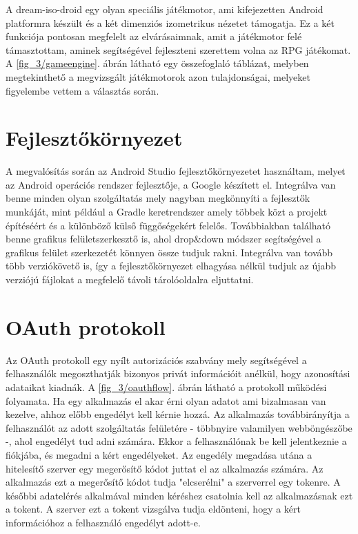 
A dream-iso-droid egy olyan speciális játékmotor, ami kifejezetten Android platformra készült és a két dimenziós izometrikus nézetet támogatja. 
Ez a két funkciója pontosan megfelelt az elvárásaimnak, amit a játékmotor felé támasztottam, aminek segítségével fejleszteni szerettem volna az RPG játékomat.
A \ref{fig_3/gameengine}. ábrán látható egy összefoglaló táblázat, melyben megtekinthető a megvizsgált játékmotorok azon tulajdonságai, melyeket figyelembe vettem a választás során. 

\section*{Fejlesztőkörnyezet}
\label{ide}

A megvalósítás során az Android Studio fejlesztőkörnyezetet használtam, melyet az Android operációs rendszer fejlesztője, a Google készített el. 
Integrálva van benne minden olyan szolgáltatás mely nagyban megkönnyíti a fejlesztők munkáját, mint például a Gradle keretrendszer amely többek közt a projekt építéséért és a különböző külső függőségekért felelős. 
Továbbiakban található benne grafikus felületszerkesztő is, ahol drop\&down módszer segítségével a grafikus felület szerkezetét könnyen össze tudjuk rakni. 
Integrálva van tovább több verziókövető is, így a fejlesztőkörnyezet elhagyása nélkül tudjuk az újabb verziójú fájlokat a megfelelő távoli tárolóoldalra eljuttatni. 

\section*{OAuth protokoll}
\label{oauth}


Az OAuth protokoll \cite{oauthprotocol} egy nyílt autorizációs szabvány mely segítségével a felhasználók megoszthatják bizonyos privát információit anélkül, hogy azonosítási adataikat kiadnák. 
A \ref{fig_3/oauthflow}. ábrán látható a protokoll működési folyamata. 
Ha egy alkalmazás el akar érni olyan adatot ami bizalmasan van kezelve, ahhoz előbb engedélyt kell kérnie hozzá. 
Az alkalmazás továbbirányítja a felhasználót az adott szolgáltatás felületére - többnyire valamilyen webböngészőbe -, ahol engedélyt tud adni számára. 
Ekkor a felhasználónak be kell jelentkeznie a fiókjába, és megadni a kért engedélyeket. 
Az engedély megadása utána a hitelesítő szerver egy megerősítő kódot juttat el az alkalmazás számára. 
Az alkalmazás ezt a megerősítő kódot tudja "elcserélni" a szerverrel egy tokenre. 
A későbbi adatelérés alkalmával minden kéréshez csatolnia kell az alkalmazásnak ezt a tokent. 
A szerver ezt a tokent vizsgálva tudja eldönteni, hogy a kért információhoz a felhasználó engedélyt adott-e. 

